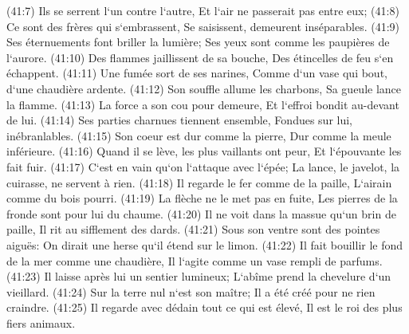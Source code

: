 \verse (41:7) Ils se serrent l`un contre l`autre, Et l`air ne passerait pas entre eux; 
\verse (41:8) Ce sont des frères qui s`embrassent, Se saisissent, demeurent inséparables. 
\verse (41:9) Ses éternuements font briller la lumière; Ses yeux sont comme les paupières de l`aurore. 
\verse (41:10) Des flammes jaillissent de sa bouche, Des étincelles de feu s`en échappent. 
\verse (41:11) Une fumée sort de ses narines, Comme d`un vase qui bout, d`une chaudière ardente. 
\verse (41:12) Son souffle allume les charbons, Sa gueule lance la flamme. 
\verse (41:13) La force a son cou pour demeure, Et l`effroi bondit au-devant de lui. 
\verse (41:14) Ses parties charnues tiennent ensemble, Fondues sur lui, inébranlables. 
\verse (41:15) Son coeur est dur comme la pierre, Dur comme la meule inférieure. 
\verse (41:16) Quand il se lève, les plus vaillants ont peur, Et l`épouvante les fait fuir. 
\verse (41:17) C`est en vain qu`on l`attaque avec l`épée; La lance, le javelot, la cuirasse, ne servent à rien. 
\verse (41:18) Il regarde le fer comme de la paille, L`airain comme du bois pourri. 
\verse (41:19) La flèche ne le met pas en fuite, Les pierres de la fronde sont pour lui du chaume. 
\verse (41:20) Il ne voit dans la massue qu`un brin de paille, Il rit au sifflement des dards. 
\verse (41:21) Sous son ventre sont des pointes aiguës: On dirait une herse qu`il étend sur le limon. 
\verse (41:22) Il fait bouillir le fond de la mer comme une chaudière, Il l`agite comme un vase rempli de parfums. 
\verse (41:23) Il laisse après lui un sentier lumineux; L`abîme prend la chevelure d`un vieillard. 
\verse (41:24) Sur la terre nul n`est son maître; Il a été créé pour ne rien craindre. 
\verse (41:25) Il regarde avec dédain tout ce qui est élevé, Il est le roi des plus fiers animaux. 

